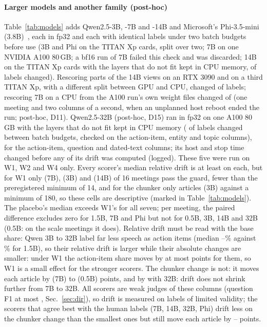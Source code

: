 \documentclass[conference]{IEEEtran}
\begin{document}
\paragraph*{Larger models and another family (post-hoc)} Table~\ref{tab:models} adds Qwen2.5-3B, -7B and -14B and Microsoft's
Phi-3.5-mini (3.8B)~\cite{phi3}, each in fp32 and each with identical labels under two batch budgets before use (3B and Phi on the
TITAN Xp cards, split over two; 7B on one NVIDIA A100 80\,GB; a bf16 run of
7B failed this check and was discarded; 14B on the TITAN Xp cards with the layers that do not fit kept in CPU memory,
\nDetFourteenmism{} of \nDetFourteenN{} labels changed). Rescoring parts of the 14B views on an RTX 3090 and on a third
TITAN Xp, with a different split between GPU and CPU, changed \nXhwFourteenmism{} of \nXhwFourteenN{} labels; rescoring
7B on a CPU from the A100 run's own weight files changed \nXhwSevenmism{} of \nXhwSevenN{} (one meeting and two columns of
a second, when an unplanned host reboot ended the run; post-hoc, D11). Qwen2.5-32B (post-hoc, D15) ran in fp32 on one A100
80\,GB with the layers that do not fit kept in CPU memory (\nDetThirtytwomism{} of \nDetThirtytwoN{} labels changed between
batch budgets, checked on the action-item, entity and topic columns), for the action-item, question and dated-text
columns; its host and stop time changed before any of its drift was computed (logged). These
five were run on W1, W2 and W4 only. Every scorer's median relative drift is at least \nSixDMin{} on each, but for
W1 only \nWoneQoneMsevenvalid{} (7B), \nWoneQoneMthreevalid{} (3B) and \nWoneQoneMfourteenvalid{} (14B) of 16 meetings
pass the guard, fewer than the preregistered minimum of 14, and for the chunker only \nWikiQdoneMthreevalid{}
articles (3B) against a minimum of 180, so these cells are descriptive (marked in Table~\ref{tab:models}). The placebo's median exceeds W1's for all seven; per meeting, the paired difference excludes
zero for 1.5B, 7B and Phi but not for 0.5B, 3B, 14B and 32B (0.5B: on the \nScaleN{} scale meetings it does). Relative drift must be read with the base share:
Qwen 3B to 32B label far less speech as action items (median \nSgWoneQoneMsevenold--\nSgWoneQoneMthirtytwoold\% against
\nSgWoneQoneold\% for 1.5B), so their relative drift is larger while their absolute changes are smaller: under W1 the
action-item share moves by at most \nSgWoneQoneMthreeabsmag{} points for them, so W1 is a small effect for the
stronger scorers. The chunker change is not: it moves each article by \nSgWikiQdoneMsevenabsmag{} (7B) to
\nSgWikiQdoneMtwoabsmag{} (0.5B) points, and by \nSgWikiQdoneMthirtytwoabsmag{} with 32B: drift does not shrink further from 7B to 32B. All scorers are weak judges of these columns (question F1 at most
\nGoldQumanualfoneMseven, Sec.~\ref{sec:dir}), so drift is measured on labels of limited validity; the scorers that
agree best with the human labels (7B, 14B, 32B, Phi) drift less on the chunker change than the smallest ones but still move
each article by \nSgWikiQdoneMsevenabsmag--\nSgWikiQdoneMphiabsmag{} points.
\end{document}
